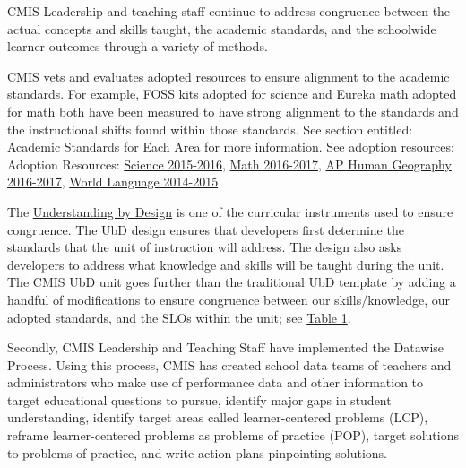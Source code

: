 
\begin{findings}

CMIS Leadership and teaching staff continue to address congruence between the actual concepts and skills taught, the academic standards, and the schoolwide learner outcomes through a variety of methods. 


CMIS vets and evaluates adopted resources to ensure alignment to the academic standards. For example, FOSS kits adopted for science and Eureka math adopted for math both have been measured to have strong alignment to the standards and the instructional shifts found within those standards. See section entitled: Academic Standards for Each Area for more information. See adoption resources: Adoption Resources: \href{https://drive.google.com/drive/folders/0ByVFfrm0zfoleXEyU3I0cTBXMVk?usp=sharing}{Science 2015-2016}, \href{https://drive.google.com/drive/folders/0ByVFfrm0zfolakRsUVNBaXhWcjQ?usp=sharing}{Math 2016-2017}, \href{https://drive.google.com/drive/folders/0ByVFfrm0zfolLUN5UThPTG5wQlE?usp=sharing}{AP Human Geography 2016-2017}, \href{https://drive.google.com/drive/folders/0ByVFfrm0zfolfkhGeTFZSVRmSFNEZmhlaWZneEE5T0lwWjNQVnlFYVVWVlljU1RBTDZQc1k?usp=sharing}{World Language 2014-2015} 


The \href{https://docs.google.com/a/cmis.ac.th/document/d/1kL1VjwfuMMa7NaWmwUrEah1BM-jJRmLAd4VJzR3HoPs/edit?usp=sharing}{Understanding by Design} is one of the curricular instruments used to ensure congruence. The UbD design ensures that developers first determine the standards that the unit of instruction will address. The design also asks developers to address what knowledge and skills will be taught during the unit. The CMIS UbD unit goes further than the traditional UbD template by adding a handful of modifications to ensure congruence between our skills/knowledge, our adopted standards, and the SLOs within the unit; see \href{https://docs.google.com/a/cmis.ac.th/document/d/1wwb5O3EmHNmzx7MOdHvi0TFjyYRWyELnyD1VRsmuj1Y/edit?usp=sharing}{Table 1}.  


Secondly, CMIS Leadership and Teaching Staff have implemented the Datawise Process. Using this process, CMIS has created school data teams of teachers and administrators who make use of performance data and other information to target educational questions to pursue, identify major gaps in student understanding, identify target areas called learner-centered problems (LCP), reframe learner-centered problems as problems of practice (POP), target solutions to problems of practice, and write action plans pinpointing solutions. 


\end{findings}
